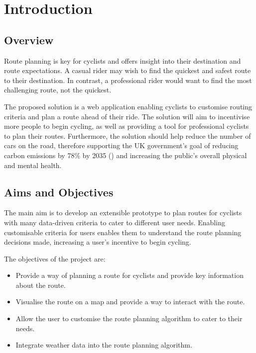 \chapter{Introduction}
\label{chap:intro}

\section{Overview}
\label{intro:overview}

Route planning is key for cyclists and offers insight into their destination and route expectations. A casual rider may wish to find the quickest and safest route to their destination. In contrast, a professional rider would want to find the most challenging route, not the quickest.

The proposed solution is a web application enabling cyclists to customise routing criteria and plan a route ahead of their ride. The solution will aim to incentivise more people to begin cycling, as well as providing a tool for professional cyclists to plan their routes. Furthermore, the solution should help reduce the number of cars on the road, therefore supporting the UK government's goal of reducing carbon emissions by 78\% by 2035 (\cite{govuk_net_2022}) and increasing the public's overall physical and mental health.

\section{Aims and Objectives}
\label{intro:aimsandobjectives}

The main aim is to develop an extensible prototype to plan routes for cyclists with many data-driven criteria to cater to different user needs. Enabling customisable criteria for users enables them to understand the route planning decisions made, increasing a user's incentive to begin cycling.
 
The objectives of the project are:
\begin{itemize}
    \item Provide a way of planning a route for cyclists and provide key information about the route.
    \item Visualise the route on a map and provide a way to interact with the route.
    \item Allow the user to customise the route planning algorithm to cater to their needs.
    \item Integrate weather data into the route planning algorithm.
\end{itemize}

